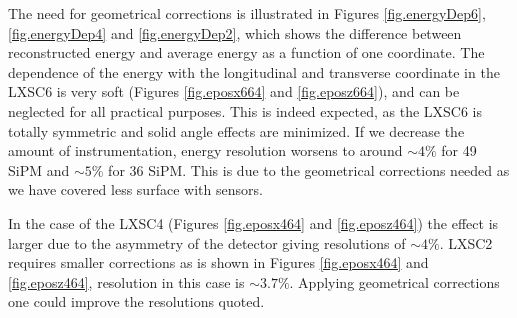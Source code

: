 The need for geometrical corrections is illustrated in Figures \ref{fig.energyDep6},\ref{fig.energyDep4} and \ref{fig.energyDep2}, which shows the difference between reconstructed energy and average energy as a function of one coordinate. The dependence of the energy with the longitudinal and transverse coordinate in the LXSC6 is very soft (Figures \ref{fig.eposx664} and \ref{fig.eposz664}), and can be neglected for all practical purposes. This is indeed expected, as the LXSC6 is totally symmetric and solid angle effects are minimized. If we decrease the amount of instrumentation, energy resolution worsens to around $\sim4\%$ for 49 SiPM and $\sim5\%$ for 36 SiPM. This is due to the geometrical corrections needed as we have covered less surface with sensors.

In the case of the LXSC4 (Figures \ref{fig.eposx464} and \ref{fig.eposz464}) the effect is larger due to the asymmetry of the detector giving resolutions of $\sim 4\%$. LXSC2 requires smaller corrections as is shown in Figures \ref{fig.eposx464} and \ref{fig.eposz464}, resolution in this case is $\sim 3.7\%$. Applying geometrical corrections one could improve the resolutions quoted.



